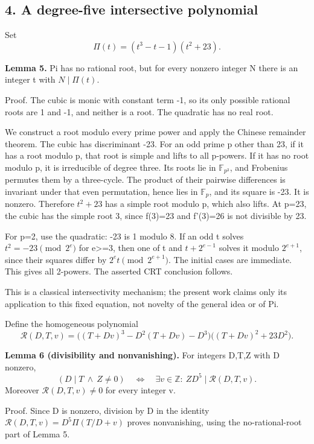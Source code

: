 \hypertarget{a-degree-five-intersective-polynomial}{%
\subsection{4. A degree-five intersective
polynomial}\label{a-degree-five-intersective-polynomial}}

Set \[
 \Pi(t)=(t^3-t-1)(t^2+23).
\]

\textbf{Lemma 5.} Pi has no rational root, but for every nonzero integer
N there is an integer t with \(N\mid\Pi(t)\).

Proof. The cubic is monic with constant term -1, so its only possible
rational roots are 1 and -1, and neither is a root. The quadratic has no
real root.

We construct a root modulo every prime power and apply the Chinese
remainder theorem. The cubic has discriminant -23. For an odd prime p
other than 23, if it has a root modulo p, that root is simple and lifts
to all p-powers. If it has no root modulo p, it is irreducible of degree
three. Its roots lie in \(\mathbb F_{p^3}\), and Frobenius permutes them
by a three-cycle. The product of their pairwise differences is invariant
under that even permutation, hence lies in \(\mathbb F_p\), and its
square is -23. It is nonzero. Therefore \(t^2+23\) has a simple root
modulo p, which also lifts. At p=23, the cubic has the simple root 3,
since f(3)=23 and f'(3)=26 is not divisible by 23.

For p=2, use the quadratic: -23 is 1 modulo 8. If an odd t solves
\(t^2=-23\pmod{2^e}\) for e\textgreater=3, then one of t and
\(t+2^{e-1}\) solves it modulo \(2^{e+1}\), since their squares differ
by \(2^et\pmod{2^{e+1}}\). The initial cases are immediate. This gives
all 2-powers. The asserted CRT conclusion follows.

This is a classical intersectivity mechanism; the present work claims
only its application to this fixed equation, not novelty of the general
idea or of Pi.

Define the homogeneous polynomial \[
 \mathcal R(D,T,v)=
 \big((T+Dv)^3-D^2(T+Dv)-D^3\big)
 \big((T+Dv)^2+23D^2\big).
 \tag{4}
\]

\textbf{Lemma 6 (divisibility and nonvanishing).} For integers D,T,Z
with D nonzero, \[
 (D\mid T\ \land\ Z\ne0)
 \quad\Longleftrightarrow\quad
 \exists v\in\mathbb Z:\ ZD^5\mid\mathcal R(D,T,v).
 \tag{5}
\] Moreover \(\mathcal R(D,T,v)\ne0\) for every integer v.

Proof. Since D is nonzero, division by D in the identity
\(\mathcal R(D,T,v)=D^5\Pi(T/D+v)\) proves nonvanishing, using the
no-rational-root part of Lemma 5.

